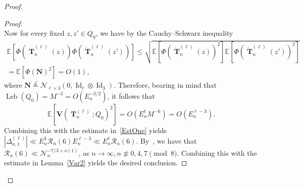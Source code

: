 \documentclass[10pt]{amsart}
\theoremstyle{definition}\newtheorem{defi}[theo]{Definition}\newtheorem{rema}[theo]{Remark}\newtheorem{exam}[theo]{Example}\newtheorem{exem}[theo]{Example}\newtheorem{nota}[theo]{Notation}
\DeclareMathOperator{\Leb}{Leb}
\DeclareMathOperator{\Id}{Id}
\DeclareMathOperator{\bT}{\mathbf{T}}
\newcommand{\scN}{\mathscr{N}}
\newcommand{\bfv}{\mathbf{V}}
\newcommand{\bfN}{\mathbf{N}}
\newcommand{\clR}{\mathcal{R}}
\newcommand{\E}[1]{\mathbb{E}\left[#1\right]}
\newcommand{\eqLaw}{ \overset{\mathcal{L}}{=} }
\newcommand{\notcon}[3]{ {#1} \not\equiv {#2} \pmod {#3} }
\newcommand{\Nn}{\mathcal{N}_n}
\begin{document}
\begin{proof}
\begin{proof}
\[\]
Now for every fixed $z,z'\in Q_0$, we have by the Cauchy--Schwarz inequality
\begin{multline*}
\E{ \Phi\left(\dot{\bT}_n^{(\ell)}(z)\right) \Phi\left(\dot{\bT}_n^{(\ell)}(z')\right) }
\leq \sqrt{\E{ \Phi\left(\dot{\bT}_n^{(\ell)}(z)\right)^2} \E{ \Phi\left(\dot{\bT}_n^{(\ell)}(z')\right)^2 }}\\ =\E{\Phi(\bfN)^2}= O(1),
\end{multline*}
where $\bfN \eqLaw \scN_{\ell \times 3}(0, \Id_{\ell}\otimes \Id_3)$. Therefore, bearing in mind that $\Leb(Q_0)=M^{-3}=O(E_n^{-3/2})$, it follows that
\[
\E{\bfv\left(\bT_n^{(\ell)};Q_0\right)^2} = O\left(E_n^{\ell}M^{-6}\right) = O\left(E_n^{\ell-3}\right).
\]
Combining this with the estimate in~\eqref{EstOne} yields $|\Delta_{n,1}^{(\ell)}| \ll E_n^3 \clR_n(6) E_n^{\ell-3} \ll E_n^{\ell} \clR_n(6)$. By~\cite[Eq.~(1.18)]{BM17}, we have that $\clR_n(6) \ll \Nn^{-7/3+o(1)}$, as $ n\to\infty,\notcon{n}{0,4,7}{8}$. Combining this with the estimate in Lemma~\ref{Var2} yields the desired conclusion.
\end{proof}




\end{proof}
\end{document}
